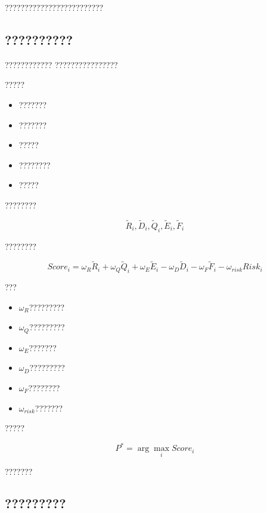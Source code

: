 ?????????????????????????



\subsection*{??????????}

????????????
????????????????

?????

\begin{itemize}
    \item ???????
    \item ???????
    \item ?????
    \item ????????
    \item ?????
\end{itemize}


????????

\begin{equation}
\tilde{R}_i,
\tilde{D}_i,
\tilde{Q}_i,
\tilde{E}_i,
\tilde{F}_i
\end{equation}


????????

\begin{equation}
Score_i
=
\omega_R\tilde{R}_i
+
\omega_Q\tilde{Q}_i
+
\omega_E\tilde{E}_i
-
\omega_D\tilde{D}_i
-
\omega_F\tilde{F}_i
-
\omega_{risk}Risk_i
\end{equation}


???

\begin{itemize}
    \item $\omega_R$?????????
    \item $\omega_Q$?????????
    \item $\omega_E$???????
    \item $\omega_D$?????????
    \item $\omega_F$????????
    \item $\omega_{risk}$???????
\end{itemize}


?????

\begin{equation}
P^{*}
=
\arg\max_i Score_i
\end{equation}

???????


\subsection*{?????????}

